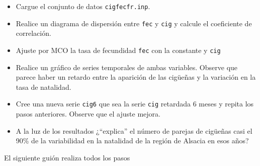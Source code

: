 \documentclass[11pt]{article}
\begin{document}
\begin{itemize}
\item Cargue el conjunto de datos \texttt{cigfecfr.inp}.

\item Realice un diagrama de dispersión entre \texttt{fec} y \texttt{cig} y calcule
el coeficiente de correlación.

\item Ajuste por MCO la tasa de fecundidad \texttt{fec} con la constante y \texttt{cig}

\item Realice un gráfico de series temporales de ambas
variables. Observe que parece haber un retardo entre la aparición
de las cigüeñas y la variación en la tasa de natalidad.

\item Cree una nueva serie \texttt{cig6} que sea la serie \texttt{cig} retardada 6
meses y repita los pasos anteriores. Observe que el ajuste
mejora.

\item A la luz de los resultados ¿``explica'' el número de parejas de
cigüeñas casi el 90\% de la variabilidad en la natalidad de la
región de Alsacia en esos años?
\end{itemize}

El siguiente guión realiza todos los pasos
{\vspace{3pt} \color{gray!70!black}
}

\vspace{12pt}

\end{document}
